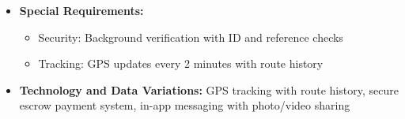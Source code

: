 \begin{itemize}
    \begin{itemize}
        \item 2a. No caregivers available: System expands search area
        \item 4a. Caregiver declines or payment fails: System suggests alternatives
        \item 6a. Emergency during service: System activates emergency protocols
    \end{itemize}
    \item \textbf{Special Requirements:}
    \begin{itemize}
        \item Security: Background verification with ID and reference checks
        \item Tracking: GPS updates every 2 minutes with route history
    \end{itemize}
    \item \textbf{Technology and Data Variations:} GPS tracking with route history, secure escrow payment system, in-app messaging with photo/video sharing
\end{itemize}

